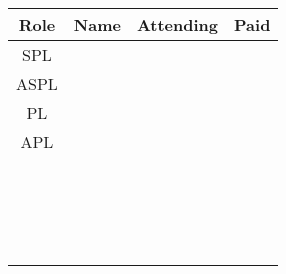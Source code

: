 \documentclass[letterpaper]{exam}
\begin{document}




\vspace{5mm}
\begin{center}
\begin{tabular}{ c | m{4in} | c | c }
  \textbf{Role} & \textbf{Name} & \textbf{Attending} & \textbf{Paid} \\
  \hline
  SPL & & & \\
  \hline
  ASPL & & & \\
  \hline
  PL & & & \\
  \hline
  APL & & & \\
  \hline
  & & & \\
  \hline
  & & & \\
  \hline
  & & & \\
  \hline
  & & & \\
  \hline
  & & & \\
  \hline
  & & & \\
  \hline
  & & & \\
  \hline
  & & & \\
  \hline
  & & & \\
  \hline
  & & & \\
  \hline
  & & & \\
  \hline
  & & & \\
  \hline
  & & & \\
  \hline
  & & & \\
  \hline
  & & & \\
  \hline
  & & & \\
  \hline
  & & & \\
  \hline
  & & & \\
\end{tabular}
\end{center}
\end{document}
